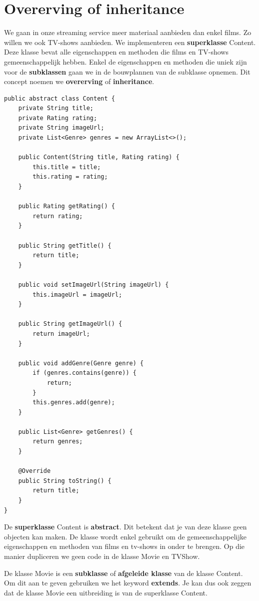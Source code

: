 \documentclass{tstextbook}
\begin{document}
\section{Overerving of inheritance}
We gaan in onze streaming service meer materiaal aanbieden dan enkel films. Zo willen we ook TV-shows aanbieden. We implementeren een \textbf{superklasse} Content. Deze klasse bevat alle eigenschappen en methoden die films en TV-shows gemeenschappelijk hebben. Enkel de eigenschappen en methoden die uniek zijn voor de \textbf{subklassen} gaan we in de bouwplannen van de subklasse opnemen. Dit concept noemen we \textbf{overerving} of \textbf{inheritance}.

\begin{lstlisting} 
public abstract class Content {
	private String title;
	private Rating rating;
	private String imageUrl;
	private List<Genre> genres = new ArrayList<>();

	public Content(String title, Rating rating) {
		this.title = title;
		this.rating = rating;
	}

	public Rating getRating() {
		return rating;
	}

	public String getTitle() {
		return title;
	}

	public void setImageUrl(String imageUrl) {
		this.imageUrl = imageUrl;
	}

	public String getImageUrl() {
		return imageUrl;
	}
	
	public void addGenre(Genre genre) {
		if (genres.contains(genre)) {
			return;
		}
		this.genres.add(genre);
	}
	
	public List<Genre> getGenres() {
		return genres;
	}

	@Override
	public String toString() {
		return title;
	}
}
\end{lstlisting}

De \textbf{superklasse} Content is \textbf{abstract}. Dit betekent dat je van deze klasse geen objecten kan maken. De klasse wordt enkel gebruikt om de gemeenschappelijke eigenschappen en methoden van films en tv-shows in onder te brengen. Op die manier dupliceren we geen code in de klasse Movie en TVShow.

De klasse Movie is een \textbf{subklasse} of \textbf{afgeleide klasse} van de klasse Content. Om dit aan te geven gebruiken we het keyword \textbf{extends}. Je kan dus ook zeggen dat de klasse Movie een uitbreiding is van de superklasse Content.
\end{document}
